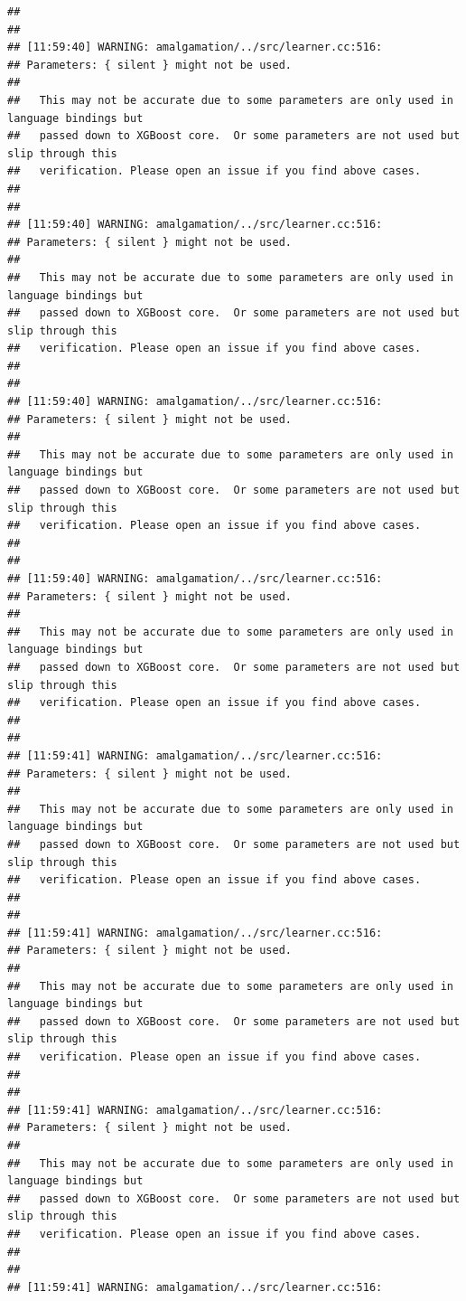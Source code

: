 \documentclass[AMS,STIX2COL]{WileyNJD-v2}\usepackage[]{graphicx}\usepackage[]{color}
\makeatletter
\newenvironment{kframe}{%
 \def\at@end@of@kframe{}%
 \ifinner\ifhmode%
  \def\at@end@of@kframe{\end{minipage}}%
  \begin{minipage}{\columnwidth}%
 \fi\fi%
 \def\FrameCommand##1{\hskip\@totalleftmargin \hskip-\fboxsep
 \colorbox{shadecolor}{##1}\hskip-\fboxsep
     \hskip-\linewidth \hskip-\@totalleftmargin \hskip\columnwidth}%
 \MakeFramed {\advance\hsize-\width
   \@totalleftmargin\z@ \linewidth\hsize
   \@setminipage}}%
 {\par\unskip\endMakeFramed%
 \at@end@of@kframe}
\newenvironment{knitrout}{}{} %
\makeatother
\begin{document}
\begin{knitrout}
\begin{kframe}
\begin{verbatim}
## 
## 
## [11:59:40] WARNING: amalgamation/../src/learner.cc:516: 
## Parameters: { silent } might not be used.
## 
##   This may not be accurate due to some parameters are only used in language bindings but
##   passed down to XGBoost core.  Or some parameters are not used but slip through this
##   verification. Please open an issue if you find above cases.
## 
## 
## [11:59:40] WARNING: amalgamation/../src/learner.cc:516: 
## Parameters: { silent } might not be used.
## 
##   This may not be accurate due to some parameters are only used in language bindings but
##   passed down to XGBoost core.  Or some parameters are not used but slip through this
##   verification. Please open an issue if you find above cases.
## 
## 
## [11:59:40] WARNING: amalgamation/../src/learner.cc:516: 
## Parameters: { silent } might not be used.
## 
##   This may not be accurate due to some parameters are only used in language bindings but
##   passed down to XGBoost core.  Or some parameters are not used but slip through this
##   verification. Please open an issue if you find above cases.
## 
## 
## [11:59:40] WARNING: amalgamation/../src/learner.cc:516: 
## Parameters: { silent } might not be used.
## 
##   This may not be accurate due to some parameters are only used in language bindings but
##   passed down to XGBoost core.  Or some parameters are not used but slip through this
##   verification. Please open an issue if you find above cases.
## 
## 
## [11:59:41] WARNING: amalgamation/../src/learner.cc:516: 
## Parameters: { silent } might not be used.
## 
##   This may not be accurate due to some parameters are only used in language bindings but
##   passed down to XGBoost core.  Or some parameters are not used but slip through this
##   verification. Please open an issue if you find above cases.
## 
## 
## [11:59:41] WARNING: amalgamation/../src/learner.cc:516: 
## Parameters: { silent } might not be used.
## 
##   This may not be accurate due to some parameters are only used in language bindings but
##   passed down to XGBoost core.  Or some parameters are not used but slip through this
##   verification. Please open an issue if you find above cases.
## 
## 
## [11:59:41] WARNING: amalgamation/../src/learner.cc:516: 
## Parameters: { silent } might not be used.
## 
##   This may not be accurate due to some parameters are only used in language bindings but
##   passed down to XGBoost core.  Or some parameters are not used but slip through this
##   verification. Please open an issue if you find above cases.
## 
## 
## [11:59:41] WARNING: amalgamation/../src/learner.cc:516: 

\end{verbatim}
\end{kframe}
\end{knitrout}
\end{document}
